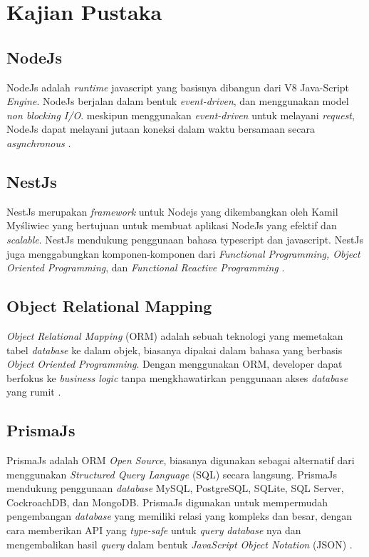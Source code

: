 

\section{Kajian Pustaka}
\subsection{NodeJs}
NodeJs adalah \textit{runtime} javascript yang basisnya dibangun dari V8 Java-Script \textit{Engine}. NodeJs berjalan dalam bentuk \textit{event-driven}, dan menggunakan model \textit{non blocking I/O}. meskipun menggunakan \textit{event-driven} untuk melayani \textit{request}, NodeJs dapat melayani jutaan koneksi dalam waktu bersamaan secara \textit{asynchronous} \cite{shah2017node}.

\subsection{NestJs}
NestJs merupakan \textit{framework} untuk Nodejs yang dikembangkan oleh Kamil Myśliwiec yang bertujuan untuk membuat aplikasi NodeJs yang efektif dan \textit{scalable}. NestJs mendukung penggunaan bahasa typescript dan javascript. NestJs juga menggabungkan komponen-komponen dari \textit{Functional Programming, Object Oriented Programming}, dan \textit{Functional Reactive Programming} \cite{pham2020developing} \cite{NestJS}.

\subsection{Object Relational Mapping}
\textit{Object Relational Mapping} (ORM) adalah sebuah teknologi yang memetakan tabel \textit{database} ke dalam objek, biasanya dipakai dalam bahasa yang berbasis \textit{Object Oriented Programming}. Dengan menggunakan ORM, developer dapat berfokus ke \textit{business logic} tanpa mengkhawatirkan penggunaan akses \textit{database} yang rumit \cite{lorenz2017object}. 

\subsection{PrismaJs}
PrismaJs adalah ORM \textit{Open} \textit{Source}, biasanya digunakan sebagai alternatif dari menggunakan \textit{Structured Query Language} (SQL) secara langsung. PrismaJs mendukung penggunaan \textit{database} MySQL, PostgreSQL, SQLite, SQL Server, CockroachDB, dan MongoDB. PrismaJs digunakan untuk mempermudah pengembangan \textit{database} yang memiliki relasi yang kompleks dan besar, dengan cara memberikan API yang \textit{type-safe} untuk \textit{query} \textit{database} nya dan mengembalikan hasil \textit{query} dalam bentuk \textit{JavaScript Object Notation} (JSON) \cite{Prisma}.

